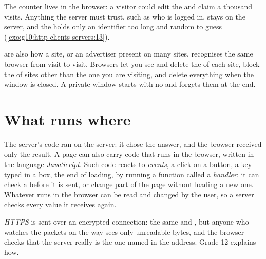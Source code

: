 The counter lives in the browser: a visitor could edit the  and claim a thousand visits. Anything the server
must trust, such as who is logged in, stays on the server, and the  holds only an identifier too long and
random to guess (\cref{exo:g10:http-clients-servers:13}).

\begin{safety}
 are also how a site, or an advertiser present on many sites, recognises the same browser from visit to
visit. Browsers let you see and delete the  of each site, block the  of sites other than the one you
are visiting, and delete everything when the window is closed. A private window starts with no  and forgets
them at the end.
\end{safety}

\section{What runs where}\label{sec:g10:http-clients-servers:where}

The server's code ran on the server: it chose the answer, and the browser received only the result. A page can also
carry code that runs in the browser, written in the language \emph{JavaScript}. Such code reacts to
\emph{events}, a click on a button, a key typed in a box, the end of loading, by running a function called a
\emph{handler}: it can check a  before it is sent, or change part of the page without loading a new one.
Whatever runs in the browser can be read and changed by the user, so a server checks every value it receives again.

\begin{definition}[HTTPS]\label{def:g10:http-clients-servers:https}
\emph{HTTPS} is  sent over an encrypted connection: the same  and , but anyone who
watches the packets on the way sees only unreadable bytes, and the browser checks that the server really is the one
named in the address. Grade 12 explains how.
\end{definition}

